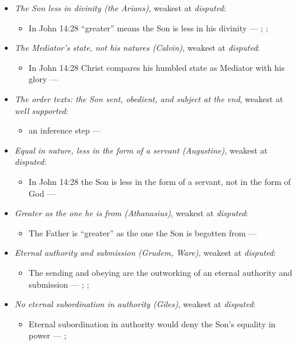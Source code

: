 \documentclass[11pt,paper=\testimonypaper,DIV=13,parskip=false]{scrartcl}
\begin{document}
\begin{itemize}
\item \emph{The Son less in divinity (the Arians)}, weakest at \emph{disputed}:
\begin{itemize}
\item In John 14:28 “greater” means the Son is less in his divinity --- \cite[De Synodis 28]{schaff-nicene-post-nicene-fathers-2-4-1892}; \cite[On the Trinity I.7.14]{schaff-nicene-post-nicene-fathers-1-3-1887}; \cite[102]{calvin-commentary-john-2-1847}
\end{itemize}
\item \emph{The Mediator’s state, not his natures (Calvin)}, weakest at \emph{disputed}:
\begin{itemize}
\item In John 14:28 Christ compares his humbled state as Mediator with his glory --- \cite[102--103]{calvin-commentary-john-2-1847}
\end{itemize}
\item \emph{The order texts: the Son sent, obedient, and subject at the end}, weakest at \emph{well supported}:
\begin{itemize}
\item an inference step --- \cite[3, The Triune God]{kibbey-living-systematic-theology-2026}
\end{itemize}
\item \emph{Equal in nature, less in the form of a servant (Augustine)}, weakest at \emph{disputed}:
\begin{itemize}
\item In John 14:28 the Son is less in the form of a servant, not in the form of God --- \cite[On the Trinity I.7.14]{schaff-nicene-post-nicene-fathers-1-3-1887}
\end{itemize}
\item \emph{Greater as the one he is from (Athanasius)}, weakest at \emph{disputed}:
\begin{itemize}
\item The Father is “greater” as the one the Son is begotten from --- \cite[Against the Arians I.13.58]{schaff-nicene-post-nicene-fathers-2-4-1892}
\end{itemize}
\item \emph{Eternal authority and submission (Grudem, Ware)}, weakest at \emph{disputed}:
\begin{itemize}
\item The sending and obeying are the outworking of an eternal authority and submission --- \cite[40]{grudem-doctrinal-deviations-2015}; \cite{grudem-ets-trinity-2016}; \cite{ware-father-son-holy-spirit-2005}
\end{itemize}
\item \emph{No eternal subordination in authority (Giles)}, weakest at \emph{disputed}:
\begin{itemize}
\item Eternal subordination in authority would deny the Son’s equality in power --- \cite[323]{giles-ets-trinity-2008}; \cite{giles-jesus-and-the-father-2006}
\end{itemize}
\end{itemize}
\end{document}
